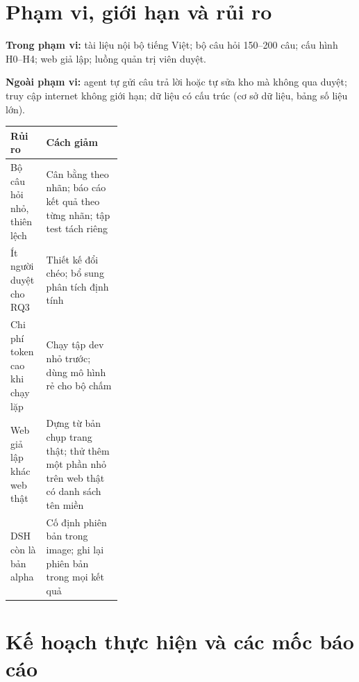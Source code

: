 \documentclass[11pt,a4paper]{article}
\begin{document}
\section{Phạm vi, giới hạn và rủi ro}

\textbf{Trong phạm vi:} tài liệu nội bộ tiếng Việt; bộ câu hỏi 150--200 câu; cấu hình H0--H4; web giả lập; luồng
quản trị viên duyệt.

\textbf{Ngoài phạm vi:} agent tự gửi câu trả lời hoặc tự sửa kho mà không qua duyệt; truy cập internet không
giới hạn; dữ liệu có cấu trúc (cơ sở dữ liệu, bảng số liệu lớn).

\begin{tabularx}{\linewidth}{@{}>{\raggedright\arraybackslash}p{0.32\linewidth}Y@{}}
\toprule
\textbf{Rủi ro} & \textbf{Cách giảm} \\
\midrule
Bộ câu hỏi nhỏ, thiên lệch & Cân bằng theo nhãn; báo cáo kết quả theo từng nhãn; tập test tách riêng \\
Ít người duyệt cho RQ3 & Thiết kế đổi chéo; bổ sung phân tích định tính \\
Chi phí token cao khi chạy lặp & Chạy tập dev nhỏ trước; dùng mô hình rẻ cho bộ chấm \\
Web giả lập khác web thật & Dựng từ bản chụp trang thật; thử thêm một phần nhỏ trên web thật có danh sách tên miền \\
DSH còn là bản alpha & Cố định phiên bản trong image; ghi lại phiên bản trong mọi kết quả \\
\bottomrule
\end{tabularx}

\section{Kế hoạch thực hiện và các mốc báo cáo}
\end{document}
